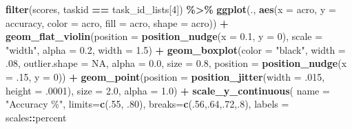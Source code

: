 \documentclass[
]{book}
\newenvironment{Shaded}{\begin{snugshade}}{\end{snugshade}}
\newcommand{\AttributeTok}[1]{\textcolor[rgb]{0.13,0.29,0.53}{#1}}
\newcommand{\ConstantTok}[1]{\textcolor[rgb]{0.56,0.35,0.01}{#1}}
\newcommand{\DecValTok}[1]{\textcolor[rgb]{0.00,0.00,0.81}{#1}}
\newcommand{\FloatTok}[1]{\textcolor[rgb]{0.00,0.00,0.81}{#1}}
\newcommand{\FunctionTok}[1]{\textcolor[rgb]{0.13,0.29,0.53}{\textbf{#1}}}
\newcommand{\NormalTok}[1]{#1}
\newcommand{\SpecialCharTok}[1]{\textcolor[rgb]{0.81,0.36,0.00}{\textbf{#1}}}
\newcommand{\StringTok}[1]{\textcolor[rgb]{0.31,0.60,0.02}{#1}}
\begin{document}
\begin{Shaded}
\begin{Highlighting}[]
\FunctionTok{filter}\NormalTok{(scores, taskid }\SpecialCharTok{==}\NormalTok{ task\_id\_lists[}\DecValTok{4}\NormalTok{]) }\SpecialCharTok{\%\textgreater{}\%}
  \FunctionTok{ggplot}\NormalTok{(., }\FunctionTok{aes}\NormalTok{(}\AttributeTok{x =}\NormalTok{ acro, }\AttributeTok{y =}\NormalTok{ accuracy, }\AttributeTok{color =}\NormalTok{ acro,}
                \AttributeTok{fill =}\NormalTok{ acro, }\AttributeTok{shape =}\NormalTok{ acro)) }\SpecialCharTok{+}
  \FunctionTok{geom\_flat\_violin}\NormalTok{(}\AttributeTok{position =} \FunctionTok{position\_nudge}\NormalTok{(}\AttributeTok{x =} \FloatTok{0.1}\NormalTok{, }\AttributeTok{y =} \DecValTok{0}\NormalTok{),}
                   \AttributeTok{scale =} \StringTok{"width"}\NormalTok{, }\AttributeTok{alpha =} \FloatTok{0.2}\NormalTok{, }\AttributeTok{width =} \FloatTok{1.5}\NormalTok{) }\SpecialCharTok{+}
  \FunctionTok{geom\_boxplot}\NormalTok{(}\AttributeTok{color =} \StringTok{"black"}\NormalTok{, }\AttributeTok{width =}\NormalTok{ .}\DecValTok{08}\NormalTok{, }\AttributeTok{outlier.shape =} \ConstantTok{NA}\NormalTok{, }\AttributeTok{alpha =} \FloatTok{0.0}\NormalTok{,}
               \AttributeTok{size =} \FloatTok{0.8}\NormalTok{, }\AttributeTok{position =} \FunctionTok{position\_nudge}\NormalTok{(}\AttributeTok{x =}\NormalTok{ .}\DecValTok{15}\NormalTok{, }\AttributeTok{y =} \DecValTok{0}\NormalTok{)) }\SpecialCharTok{+}
  \FunctionTok{geom\_point}\NormalTok{(}\AttributeTok{position =} \FunctionTok{position\_jitter}\NormalTok{(}\AttributeTok{width =}\NormalTok{ .}\DecValTok{015}\NormalTok{, }\AttributeTok{height =}\NormalTok{ .}\DecValTok{0001}\NormalTok{),}
             \AttributeTok{size =} \FloatTok{2.0}\NormalTok{, }\AttributeTok{alpha =} \FloatTok{1.0}\NormalTok{) }\SpecialCharTok{+}
  \FunctionTok{scale\_y\_continuous}\NormalTok{(}
    \AttributeTok{name =} \StringTok{"Accuracy \%"}\NormalTok{,}
    \AttributeTok{limits=}\FunctionTok{c}\NormalTok{(.}\DecValTok{55}\NormalTok{, .}\DecValTok{80}\NormalTok{),}
    \AttributeTok{breaks=}\FunctionTok{c}\NormalTok{(.}\DecValTok{56}\NormalTok{,.}\DecValTok{64}\NormalTok{,.}\DecValTok{72}\NormalTok{,.}\DecValTok{8}\NormalTok{),}
    \AttributeTok{labels =}\NormalTok{ scales}\SpecialCharTok{::}\NormalTok{percent}


\end{Highlighting}
\end{Shaded}
\end{document}
